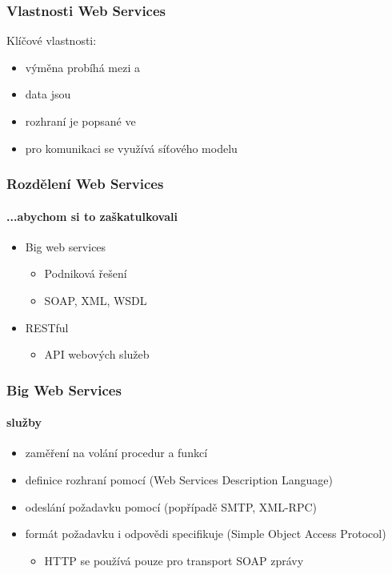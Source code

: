 \documentclass[12pt]{beamer}
\begin{document}
\begin{frame}
  \frametitle{Vlastnosti Web Services}

  \begin{block}{Klíčové vlastnosti:}
    \begin{itemize}
      \item výměna probíhá mezi  a 
      \item data jsou 
      \item rozhraní je popsané ve 
      \item pro komunikaci se využívá  síťového modelu
    \end{itemize}
  \end{block}
\end{frame}

\begin{frame}
  \frametitle{Rozdělení Web Services}
  \framesubtitle{...abychom si to zaškatulkovali}
	\begin{itemize}
      \item {\LARGE Big web services}
		\begin{itemize}
			\item Podniková řešení
			\item SOAP, XML, WSDL
		\end{itemize}
      \vspace{1cm}
      \item {\LARGE RESTful}
		\begin{itemize}
			\item API webových služeb
		\end{itemize}
    \end{itemize}
\end{frame}

\begin{frame}
	\frametitle{Big Web Services}
	\framesubtitle{ služby}
	\begin{itemize}
		\item zaměření na volání procedur a funkcí
		\item definice rozhraní pomocí  (Web Services Description Language)
		\item odeslání požadavku pomocí  (popřípadě SMTP, XML-RPC)
		\item formát požadavku i odpovědi specifikuje  (Simple Object Access Protocol)
		\begin{itemize}
			\item HTTP se používá pouze pro transport SOAP zprávy
		\end{itemize}
	\end{itemize}
\end{frame}
\end{document}
